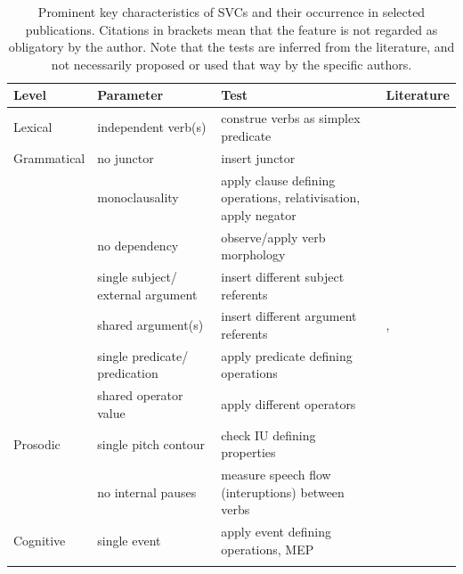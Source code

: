 \begin{table}
\begin{scriptsize}
\begin{tabular}{l L{3.5cm} L{3.5cm} L{3.5cm}}
\lsptoprule 
\textbf{Level} & \textbf{Parameter} & \textbf{Test} & \textbf{Literature} \\
\hline Lexical & independent verb(s) & construe verbs as simplex predicate & \citet{bril2004complex, Aikhenvald2006, haspelmath2016serial} \\
\hline Grammatical & no junctor & insert junctor & \citet{Aikhenvald2006, muysken2006serial, haspelmath2016serial} \\
 & monoclausality & apply clause defining operations, relativisation, apply negator & \citet{bril2004complex, Aikhenvald2006, haspelmath2016serial} \\
 & no dependency & observe/apply verb morphology & \citet{Durie1997, Aikhenvald2006} \\
 & single subject/ external argument & insert different subject referents & \citet{Durie1997, muysken2006serial} \\
 & shared argument(s) & insert different argument referents & \citet{Durie1997, bril2004complex}, \citep{Aikhenvald2006} \\
 & single predicate/ predication & apply predicate defining operations & \citet{bril2004complex, Aikhenvald2006} \\
 & shared operator value & apply different operators & \citet{Durie1997, bril2004complex, Aikhenvald2006, muysken2006serial} \\
\hline Prosodic & single pitch contour & check IU defining properties & \citet{Durie1997, bril2004complex, Aikhenvald2006} \\
 & no internal pauses & measure speech flow (interuptions) between verbs & \citet{bril2004complex, muysken2006serial} \\
\hline Cognitive & single event & apply event defining operations, MEP & \citet{Durie1997, Aikhenvald2006} \\
\lspbottomrule
\end{tabular}
\caption[Key characteristics of SVCs]{Prominent key characteristics of SVCs and their occurrence in selected publications. Citations in brackets mean that the feature is not regarded as obligatory by the author. Note that the tests are inferred from the literature, and not necessarily proposed or used that way by the specific authors.} \label{tab:keyfeatsvc}
\end{scriptsize}
\end{table}

